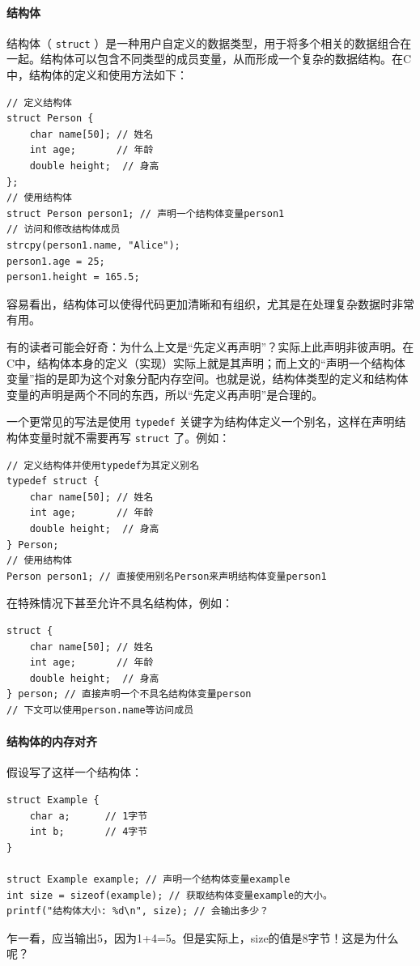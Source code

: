 \paragraph{结构体}

结构体（ \texttt{struct} ）是一种用户自定义的数据类型，用于将多个相关的数据组合在一起。结构体可以包含不同类型的成员变量，从而形成一个复杂的数据结构。在C中，结构体的定义和使用方法如下：
\begin{verbatim}
// 定义结构体
struct Person {
    char name[50]; // 姓名
    int age;       // 年龄
    double height;  // 身高
};
// 使用结构体
struct Person person1; // 声明一个结构体变量person1
// 访问和修改结构体成员
strcpy(person1.name, "Alice");
person1.age = 25;
person1.height = 165.5;
\end{verbatim}

容易看出，结构体可以使得代码更加清晰和有组织，尤其是在处理复杂数据时非常有用。

有的读者可能会好奇：为什么上文是“先定义再声明”？实际上此声明非彼声明。在C中，结构体本身的定义（实现）实际上就是其声明；而上文的“声明一个结构体变量”指的是即为这个对象分配内存空间。也就是说，结构体类型的定义和结构体变量的声明是两个不同的东西，所以“先定义再声明”是合理的。

一个更常见的写法是使用 \texttt{typedef} 关键字为结构体定义一个别名，这样在声明结构体变量时就不需要再写 \texttt{struct} 了。例如：
\begin{verbatim}
// 定义结构体并使用typedef为其定义别名
typedef struct {
    char name[50]; // 姓名
    int age;       // 年龄
    double height;  // 身高
} Person;
// 使用结构体
Person person1; // 直接使用别名Person来声明结构体变量person1
\end{verbatim}

在特殊情况下甚至允许不具名结构体，例如：
\begin{verbatim}
struct {
    char name[50]; // 姓名
    int age;       // 年龄
    double height;  // 身高
} person; // 直接声明一个不具名结构体变量person
// 下文可以使用person.name等访问成员
\end{verbatim}

\paragraph{结构体的内存对齐}

假设写了这样一个结构体：
\begin{verbatim}
struct Example {
    char a;      // 1字节
    int b;       // 4字节
}

struct Example example; // 声明一个结构体变量example
int size = sizeof(example); // 获取结构体变量example的大小。
printf("结构体大小: %d\n", size); // 会输出多少？
\end{verbatim}
乍一看，应当输出5，因为1+4=5。但是实际上，size的值是8字节！这是为什么呢？

